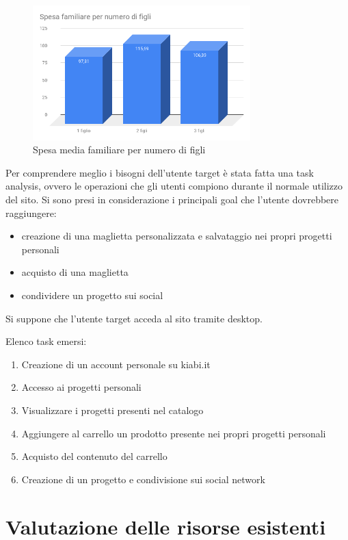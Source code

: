 \documentclass[12pt,italian,]{report}
\begin{document}
\begin{figure}[h]
\centering
\includegraphics[width=0.75\textwidth]{img/Spesa_familiare_per_numero_di_figli.png}
\caption{Spesa media familiare per numero di figli}
\label{spesa_media_n_figli}
\end{figure}

Per comprendere meglio i bisogni dell'utente target è stata fatta una task analysis, ovvero le operazioni che gli utenti compiono durante il normale utilizzo del sito. Si sono presi in considerazione i principali goal che l'utente dovrebbere raggiungere:
\begin{itemize}
\item creazione di una maglietta personalizzata e salvataggio nei propri progetti personali
\item acquisto di una maglietta
\item condividere un progetto sui social
\end{itemize}

Si suppone che l'utente target acceda al sito tramite desktop.

Elenco task emersi:
\begin{enumerate}
\item Creazione di un account personale su kiabi.it
\item Accesso ai progetti personali
\item Visualizzare i progetti presenti nel catalogo
\item Aggiungere al carrello un prodotto presente nei propri progetti personali
\item Acquisto del contenuto del carrello
\item Creazione di un progetto e condivisione sui social network 
\end{enumerate}

\chapter{Valutazione delle risorse
esistenti}\label{valutazione-delle-risorse-esistenti}
\end{document}
